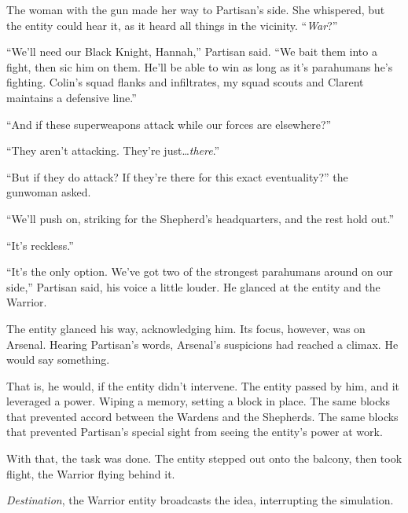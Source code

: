 The woman with the gun made her way to Partisan's side.  She whispered, but the entity could hear it, as it heard all things in the vicinity.  ``\emph{War}?''



``We'll need our Black Knight, Hannah,'' Partisan said.  ``We bait them into a fight, then sic him on them.  He'll be able to win as long as it's parahumans he's fighting.  Colin's squad flanks and infiltrates, my squad scouts and Clarent maintains a defensive line.''



``And if these superweapons attack while our forces are elsewhere?''



``They aren't attacking.  They're just\ldots \emph{there}.''



``But if they do attack?  If they're there for this exact eventuality?'' the gunwoman asked.



``We'll push on, striking for the Shepherd's headquarters, and the rest hold out.''



``It's reckless.''



``It's the only option.  We've got two of the strongest parahumans around on our side,'' Partisan said, his voice a little louder.  He glanced at the entity and the Warrior.



The entity glanced his way, acknowledging him.  Its focus, however, was on Arsenal.  Hearing Partisan's words, Arsenal's suspicions had reached a climax.  He would say something.



That is, he would, if the entity didn't intervene.  The entity passed by him, and it leveraged a power.  Wiping a memory, setting a block in place.  The same blocks that prevented accord between the Wardens and the Shepherds.  The same blocks that prevented Partisan's special sight from seeing the entity's power at work.



With that, the task was done.  The entity stepped out onto the balcony, then took flight, the Warrior flying behind it.



\blacksquare



\emph{Destination}, the Warrior entity broadcasts the idea, interrupting the simulation.



